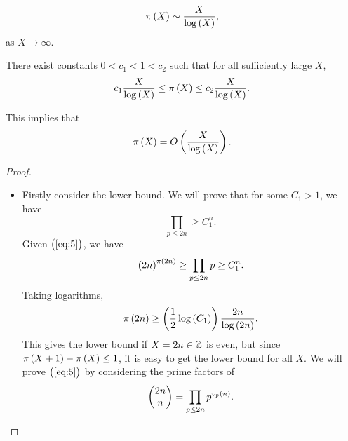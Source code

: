 \begin{theorem}
$$ \pi\br{X} \sim \dfrac{X}{\log\br{X}}, $$
as $ X \to \infty $.
\end{theorem}

\begin{theorem}
There exist constants $ 0 < c_1 < 1 < c_2 $ such that for all sufficiently large $ X $,
$$ c_1\dfrac{X}{\log\br{X}} \le \pi\br{X} \le c_2\dfrac{X}{\log\br{X}}. $$
\end{theorem}

This implies that
$$ \pi\br{X} = O\br{\dfrac{X}{\log\br{X}}}. $$


\begin{proof}
\hfill
\begin{itemize}
\item Firstly consider the lower bound. We will prove that for some $ C_1 > 1 $, we have
\begin{equation}
\label{eq:5}
\prod_{p \le 2n} \ge C_1^n.
\end{equation}
Given $ \br{\ref{eq:5}} $, we have
$$ \br{2n}^{\pi\br{2n}} \ge \prod_{p \le 2n} p \ge C_1^n. $$
Taking logarithms,
$$ \pi\br{2n} \ge \br{\dfrac{1}{2}\log\br{C_1}}\dfrac{2n}{\log\br{2n}}. $$
This gives the lower bound if $ X = 2n \in \mathbb{Z} $ is even, but since $ \pi\br{X + 1} - \pi\br{X} \le 1 $, it is easy to get the lower bound for all $ X $. We will prove $ \br{\ref{eq:5}} $ by considering the prime factors of
$$ \twobyone{2n}{n} = \prod_{p \le 2n} p^{v_p\br{n}}. $$

\pagebreak


\end{itemize}
\end{proof}
